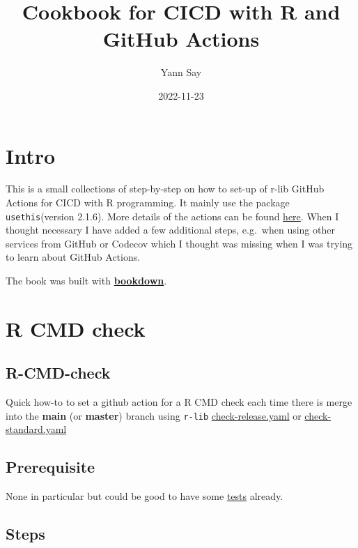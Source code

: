 \documentclass[
]{book}
\title{Cookbook for CICD with R and GitHub Actions}
\author{Yann Say}
\date{2022-11-23}
\begin{document}
\maketitle

{
\setcounter{tocdepth}{1}
\tableofcontents
}
\hypertarget{intro}{%
\chapter{Intro}\label{intro}}

This is a small collections of step-by-step on how to set-up of r-lib GitHub Actions for CICD with R programming. It mainly use the package \texttt{usethis}(version 2.1.6). More details of the actions can be found \href{https://github.com/r-lib/actions/tree/v2-branch/examples}{here}. When I thought necessary I have added a few additional steps, e.g.~when using other services from GitHub or Codecov which I thought was missing when I was trying to learn about GitHub Actions.

The book was built with \href{https://github.com/rstudio/bookdown}{\textbf{bookdown}}.

\hypertarget{r-cmd-check}{%
\chapter{R CMD check}\label{r-cmd-check}}

\hypertarget{r-cmd-check-1}{%
\section{R-CMD-check}\label{r-cmd-check-1}}

Quick how-to to set a github action for a R CMD check each time there is merge into the \textbf{main} (or \textbf{master}) branch using \texttt{r-lib} \href{https://github.com/r-lib/actions/blob/v2-branch/examples/check-release.yaml}{check-release.yaml} or \href{https://github.com/r-lib/actions/blob/v2-branch/examples/check-standard.yaml}{check-standard.yaml}

\hypertarget{prerequisite}{%
\section{Prerequisite}\label{prerequisite}}

None in particular but could be good to have some \href{https://r-pkgs.org/testing-basics.html}{tests} already.

\hypertarget{steps}{%
\section{Steps}\label{steps}}
\end{document}
